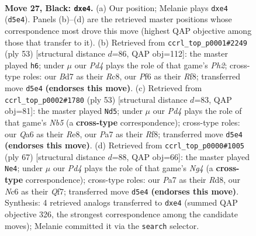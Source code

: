 \documentclass[11pt]{article}
\begin{document}
\clearpage

\begin{figure}[p]\centering
\begin{subfigure}{0.46\textwidth}\centering
\resizebox{\linewidth}{!}{%
\newchessgame
\chessboard[
  setfen={r1r5/pppbk3/q1n2p2/P2p4/1P1PP3/2Q3P1/8/RNB2RK1 b - - 0 27},
  showmover=false,
  pgfstyle=straightmove, color=movearrow, markmove={d5-e4}
]}
\caption{}
\end{subfigure}\hfill
\begin{subfigure}{0.46\textwidth}\centering
\resizebox{\linewidth}{!}{%
\newchessgame
\chessboard[
  setfen={2r2rk1/1p1b3p/pq1PppP1/8/3nN1Q1/8/PPP5/1K1R2R1 b - - 0 27},
  showmover=false,
  pgfstyle=straightmove, color=movearrow, markmove={h7-h6}
]}
\caption{}
\end{subfigure}
\\[4pt]
\begin{subfigure}{0.46\textwidth}\centering
\resizebox{\linewidth}{!}{%
\newchessgame
\chessboard[
  setfen={4rrk1/8/ppq1Pb1p/2p5/Pn1p2B1/8/1PP1N1PP/R2Q1R1K b - - 1 27},
  showmover=false,
  pgfstyle=straightmove, color=movearrow, markmove={b4-d5}
]}
\caption{}
\end{subfigure}\hfill
\begin{subfigure}{0.46\textwidth}\centering
\resizebox{\linewidth}{!}{%
\newchessgame
\chessboard[
  setfen={3r2k1/2p2qp1/p2r3p/3P1pn1/5P2/P3p2P/1B2RPP1/3R1Q1K b - - 1 34},
  showmover=false,
  pgfstyle=straightmove, color=movearrow, markmove={g5-e4}
]}
\caption{}
\end{subfigure}
\caption{\textbf{Move 27, Black: \texttt{dxe4}.} (a) Our position; Melanie plays \texttt{dxe4} (\texttt{d5e4}). Panels (b)--(d) are the retrieved master positions whose correspondence most drove this move (highest QAP objective among those that transfer to it). (b) Retrieved from \texttt{ccrl\_top\_p0001\#2249} (ply 53) [structural distance $d$=86, QAP obj=112]: the master played \texttt{h6}; under $\mu$ our \emph{Pd4} plays the role of that game's \emph{Ph2}; cross-type roles: our \emph{B}d7 as their \emph{R}c8, our \emph{P}f6 as their \emph{R}f8; transferred move \texttt{d5e4} \textbf{(endorses this move)}. (c) Retrieved from \texttt{ccrl\_top\_p0002\#1780} (ply 53) [structural distance $d$=83, QAP obj=81]: the master played \texttt{Nd5}; under $\mu$ our \emph{Pd4} plays the role of that game's \emph{Nb5} (a \textbf{cross-type} correspondence); cross-type roles: our \emph{Q}a6 as their \emph{R}e8, our \emph{P}a7 as their \emph{R}f8; transferred move \texttt{d5e4} \textbf{(endorses this move)}. (d) Retrieved from \texttt{ccrl\_top\_p0000\#1005} (ply 67) [structural distance $d$=88, QAP obj=66]: the master played \texttt{Ne4}; under $\mu$ our \emph{Pd4} plays the role of that game's \emph{Ng4} (a \textbf{cross-type} correspondence); cross-type roles: our \emph{P}a7 as their \emph{R}d8, our \emph{N}c6 as their \emph{Q}f7; transferred move \texttt{d5e4} \textbf{(endorses this move)}. Synthesis: 4 retrieved analogs transferred to \texttt{dxe4} (summed QAP objective 326, the strongest correspondence among the candidate moves); Melanie committed it via the \texttt{search} selector.}
\label{fig:thought-m53}
\end{figure}
\end{document}
